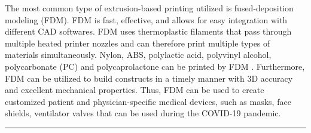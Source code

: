 \documentclass[12pt, letterpaper]{article}
\begin{document}
\begin{center}
The most common type of extrusion-based printing utilized is fused-deposition modeling (FDM). FDM is fast, effective, and allows for easy integration with different CAD softwares. FDM uses thermoplastic filaments that pass through multiple heated printer nozzles and can therefore print multiple types of materials simultaneously. Nylon, ABS, polylactic acid, polyvinyl alcohol, polycarbonate (PC) and polycaprolactone can be printed by FDM . Furthermore, FDM can be utilized to build constructs in a timely manner with 3D accuracy and excellent mechanical properties. Thus, FDM can be used to create customized patient and physician-specific medical devices, such as masks, face shields, ventilator valves that can be used during the COVID-19 pandemic.
\rule{\textwidth}{0.5pt}
\end{center}
\end{document}
